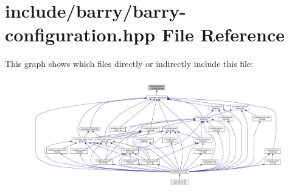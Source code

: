 \hypertarget{barry-configuration_8hpp}{}\section{include/barry/barry-\/configuration.hpp File Reference}
\label{barry-configuration_8hpp}
This graph shows which files directly or indirectly include this file\+:\nopagebreak
\begin{figure}[H]
\begin{center}
\leavevmode
\includegraphics[width=350pt]{barry-configuration_8hpp__dep__incl}
\end{center}
\end{figure}

